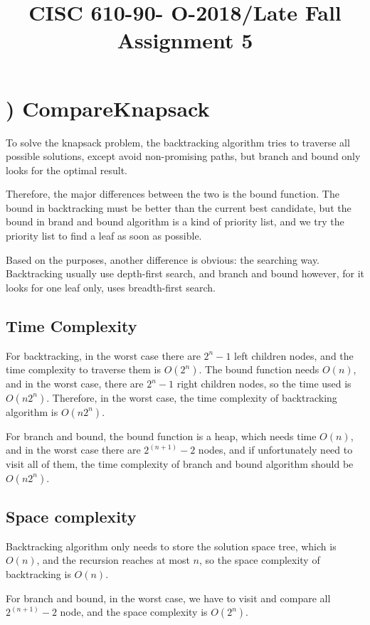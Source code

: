 \documentclass[natbib,12pt]{article}
\title{CISC 610-90- O-2018/Late Fall Assignment 5}
\date{}
\begin{document}
\maketitle


\section{) CompareKnapsack}
To solve the knapsack problem, the backtracking algorithm tries to traverse all possible solutions, except avoid non-promising paths, but branch and bound only looks for the optimal result. 

Therefore, the major differences between the two is the bound function. The bound in backtracking must be better than the current best candidate, but the bound in brand and bound algorithm is a kind of priority list, and we try the priority list to find a leaf as soon as possible. 

Based on the purposes, another difference is obvious: the searching way. Backtracking usually use depth-first search, and branch and bound however, for it looks for one leaf only, uses breadth-first search.

\subsection{Time Complexity}

For backtracking, in the worst case there are $2^n - 1$ left children nodes, and the time complexity to traverse them is $O(2^n)$. The bound function needs $O(n)$, and in the worst case, there are $2^n -1$ right children nodes, so the time used is $O(n2^n)$. Therefore, in the worst case, the time complexity of backtracking algorithm is $O(n2^n)$.

For branch and bound, the bound function is a heap, which needs time $O(n)$, and in the worst case there are $2^{(n + 1)} - 2$ nodes, and if unfortunately need to visit all of them, the time complexity of branch and bound algorithm should be $O(n2^n)$.

\subsection{Space complexity}

Backtracking algorithm only needs to store the solution space tree, which is $O(n)$, and the recursion reaches at most $n$, so the space complexity of backtracking is $O(n)$.

For branch and bound, in the worst case, we have to visit and compare all $2^{(n+1)}-2$ node, and the space complexity is $O(2^n)$.
\end{document}
